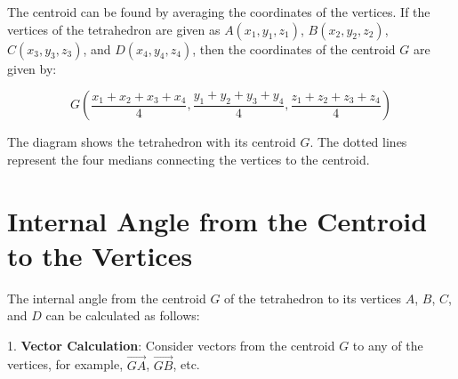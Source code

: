 \documentclass[a4paper,12pt]{article}
\begin{document}
The centroid can be found by averaging the coordinates of the vertices. If the vertices of the tetrahedron are given as \( A(x_1, y_1, z_1) \), \( B(x_2, y_2, z_2) \), \( C(x_3, y_3, z_3) \), and \( D(x_4, y_4, z_4) \), then the coordinates of the centroid \( G \) are given by:

\[
G \left( \frac{x_1 + x_2 + x_3 + x_4}{4}, \frac{y_1 + y_2 + y_3 + y_4}{4}, \frac{z_1 + z_2 + z_3 + z_4}{4} \right)
\]

\begin{center}
\end{center}

\noindent
The diagram shows the tetrahedron with its centroid \( G \). The dotted lines represent the four medians connecting the vertices to the centroid.


\section{Internal Angle from the Centroid to the Vertices}
The internal angle from the centroid \( G \) of the tetrahedron to its vertices \( A \), \( B \), \( C \), and \( D \) can be calculated as follows:

1. \textbf{Vector Calculation}: Consider vectors from the centroid \( G \) to any of the vertices, for example, \( \overrightarrow{GA} \), \( \overrightarrow{GB} \), etc.
\end{document}

